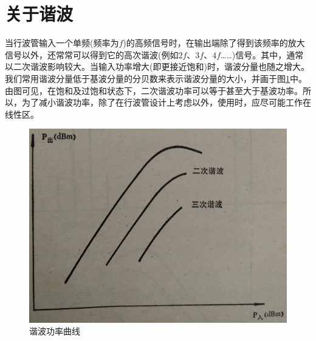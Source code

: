 \section{关于谐波}
当行波管输入一个单频(频率为$ f $)的高频信号时，在输出端除了得到该频率的放大信号以外，还常常可以得到它的高次谐波(例如$ 2f $、$ 3f $、$ 4f $……)信号。其中，通常以二次谐波影响较大。当输入功率增大(即更接近饱和)时，谐波分量也随之增大。我们常用谐波分量低于基波分量的分贝数来表示谐波分量的大小，并画于图\ref{ch11-21}中。由图可见，在饱和及过饱和状态下，二次谐波功率可以等于甚至大于基波功率。所以，为了减小谐波功率，除了在行波管设计上考虑以外，使用时，应尽可能工作在线性区。
\begin{figure}[phtb]
	\centering
	\includegraphics[width=0.6\linewidth]{figure/ch11-21}
	\caption{谐波功率曲线}
	\label{ch11-21}
\end{figure}
